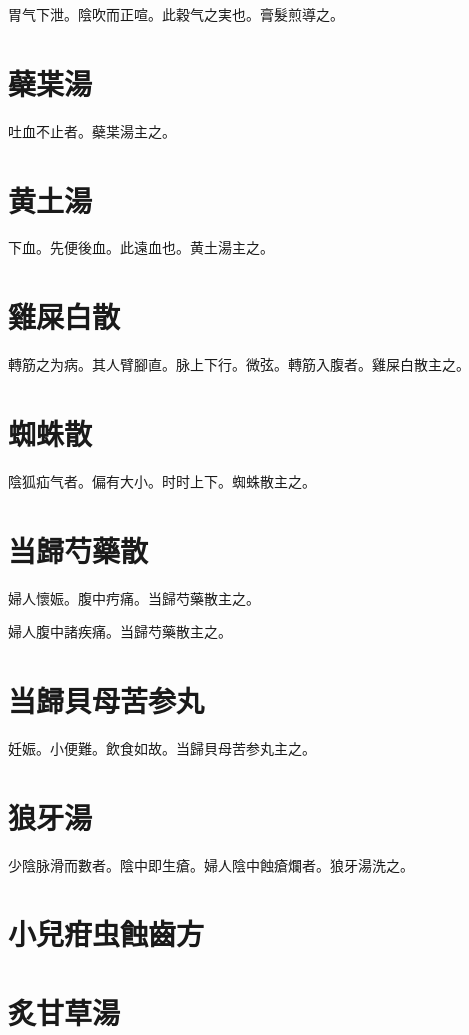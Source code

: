 \documentclass[b5paper,twoside,zihao=-4,UTF8]{ctexbook}
\begin{document}
胃气下泄。陰吹而正喧。此穀气之実也。膏髮煎導之。

\section{蘗枼湯}

吐血不止者。蘗枼湯主之。

\section{黄土湯}

下血。先便後血。此遠血也。黄土湯主之。

\section{雞屎白散}

轉筋之为病。其人臂腳直。脉上下行。微弦。轉筋入腹者。雞屎白散主之。

\section{蜘蛛散}

陰狐疝气者。偏有大小。时时上下。蜘蛛散主之。

\section{当歸芍藥散}

婦人懷娠。腹中㽲痛。当歸芍藥散主之。

婦人腹中諸疾痛。当歸芍藥散主之。

\section{当歸貝母苦参丸}

妊娠。小便難。飲食如故。当歸貝母苦参丸主之。

\section{狼牙湯}

少陰脉滑而數者。陰中即生瘡。{婦人}陰中蝕瘡爛者。狼牙湯洗之。

\section{小兒疳虫蝕齒方}

\section{炙甘草湯}
\end{document}
